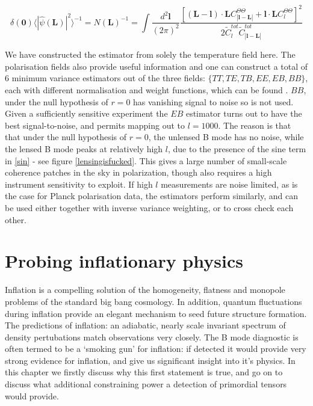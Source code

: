 \documentclass[a4paper,10pt]{article}
\renewcommand{\v}[1]{\mathbf{#1}}
\newcommand{\finttwo}[1]{\int \frac{d^2 \v{#1}}{(2\pi)^2}}
\begin{document}
\begin{equation}
\delta(\v{0}) \langle |\hat{\psi}(\v{L})|^2 \rangle^{-1} =  N(\v{L})^{-1} = \finttwo{l}  \frac{[(\v{L}-\v{l})\cdot\v{L}C^{\Theta\Theta}_{|\v{l}-\v{L}|}+\v{l}\cdot\v{L}C_l^{\Theta\Theta}]^2}{2\tilde{C}_l^{tot}\tilde{C}_{|\v{l}-\v{L}|}^{tot}}
\end{equation}

We have constructed the estimator from solely the temperature field here. The polarisation fields also provide useful information and one can construct a total of 6 minimum variance estimators out of the three fields: $\{TT, TE, TB, EE, EB, BB\}$, each with different normalisation and weight functions, which can be found \cite{hu-estimator}. $BB$, under the null hypothesis of $r=0$ has vanishing signal to noise so is not used. Given a sufficiently sensitive experiment the $EB$ estimator turns out to have the best signal-to-noise, and permits mapping out to $l=1000$. The reason is that that under the null hypothesis of $r=0$, the unlensed B mode has no noise, while the lensed B mode peaks at relatively high $l$, due to the presence of the sine term in \ref{sin} - see figure \ref{lensingisfucked}. This gives a large number of small-scale coherence patches in the sky in polarization, though also requires a high instrument sensitivity to exploit. If high $l$ measurements are noise limited, as is the case for Planck polarisation data, the estimators perform similarly, and can be used either together with inverse variance weighting, or to cross check each other.



\section{Probing inflationary physics}

Inflation is a compelling solution of the homogeneity, flatness and monopole problems of the standard big bang cosmology. In addition, quantum fluctuations during inflation provide an elegant mechanism to seed future structure formation. The predictions of inflation: an adiabatic, nearly scale invariant spectrum of density pertubations match observations very closely. The B mode diagnostic is often termed to be a `smoking gun' for inflation: if detected it would provide very strong evidence for inflation, and give us significant insight into it's physics. In this chapter we firstly discuss why this first statement is true, and go on to discuss what additional constraining power a detection of primordial tensors would provide.
\end{document}
